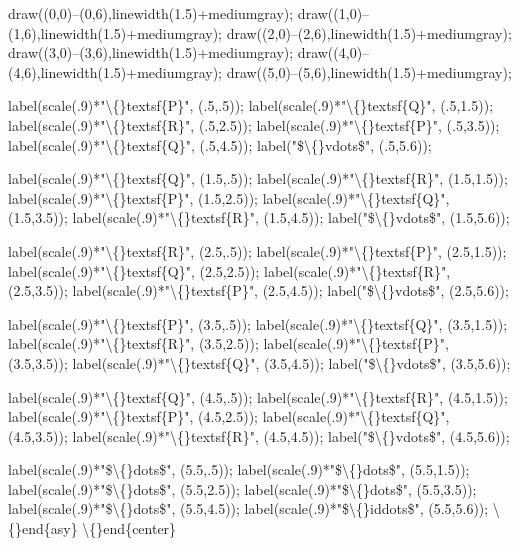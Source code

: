 \documentclass{article}
\begin{document}
\begin{enumerate}[label=\arabic*., itemsep=0.5em]
draw((0,0)--(0,6),linewidth(1.5)+mediumgray);
draw((1,0)--(1,6),linewidth(1.5)+mediumgray);
draw((2,0)--(2,6),linewidth(1.5)+mediumgray);
draw((3,0)--(3,6),linewidth(1.5)+mediumgray);
draw((4,0)--(4,6),linewidth(1.5)+mediumgray);
draw((5,0)--(5,6),linewidth(1.5)+mediumgray);

label(scale(.9)*"\textbackslash\{\}textsf\{P\}", (.5,.5));
label(scale(.9)*"\textbackslash\{\}textsf\{Q\}", (.5,1.5));
label(scale(.9)*"\textbackslash\{\}textsf\{R\}", (.5,2.5));
label(scale(.9)*"\textbackslash\{\}textsf\{P\}", (.5,3.5));
label(scale(.9)*"\textbackslash\{\}textsf\{Q\}", (.5,4.5));
label("\$\textbackslash\{\}vdots\$", (.5,5.6));

label(scale(.9)*"\textbackslash\{\}textsf\{Q\}", (1.5,.5));
label(scale(.9)*"\textbackslash\{\}textsf\{R\}", (1.5,1.5));
label(scale(.9)*"\textbackslash\{\}textsf\{P\}", (1.5,2.5));
label(scale(.9)*"\textbackslash\{\}textsf\{Q\}", (1.5,3.5));
label(scale(.9)*"\textbackslash\{\}textsf\{R\}", (1.5,4.5));
label("\$\textbackslash\{\}vdots\$", (1.5,5.6));

label(scale(.9)*"\textbackslash\{\}textsf\{R\}", (2.5,.5));
label(scale(.9)*"\textbackslash\{\}textsf\{P\}", (2.5,1.5));
label(scale(.9)*"\textbackslash\{\}textsf\{Q\}", (2.5,2.5));
label(scale(.9)*"\textbackslash\{\}textsf\{R\}", (2.5,3.5));
label(scale(.9)*"\textbackslash\{\}textsf\{P\}", (2.5,4.5));
label("\$\textbackslash\{\}vdots\$", (2.5,5.6));

label(scale(.9)*"\textbackslash\{\}textsf\{P\}", (3.5,.5));
label(scale(.9)*"\textbackslash\{\}textsf\{Q\}", (3.5,1.5));
label(scale(.9)*"\textbackslash\{\}textsf\{R\}", (3.5,2.5));
label(scale(.9)*"\textbackslash\{\}textsf\{P\}", (3.5,3.5));
label(scale(.9)*"\textbackslash\{\}textsf\{Q\}", (3.5,4.5));
label("\$\textbackslash\{\}vdots\$", (3.5,5.6));

label(scale(.9)*"\textbackslash\{\}textsf\{Q\}", (4.5,.5));
label(scale(.9)*"\textbackslash\{\}textsf\{R\}", (4.5,1.5));
label(scale(.9)*"\textbackslash\{\}textsf\{P\}", (4.5,2.5));
label(scale(.9)*"\textbackslash\{\}textsf\{Q\}", (4.5,3.5));
label(scale(.9)*"\textbackslash\{\}textsf\{R\}", (4.5,4.5));
label("\$\textbackslash\{\}vdots\$", (4.5,5.6));

label(scale(.9)*"\$\textbackslash\{\}dots\$", (5.5,.5));
label(scale(.9)*"\$\textbackslash\{\}dots\$", (5.5,1.5));
label(scale(.9)*"\$\textbackslash\{\}dots\$", (5.5,2.5));
label(scale(.9)*"\$\textbackslash\{\}dots\$", (5.5,3.5));
label(scale(.9)*"\$\textbackslash\{\}dots\$", (5.5,4.5));
label(scale(.9)*"\$\textbackslash\{\}iddots\$", (5.5,5.6));
\textbackslash\{\}end\{asy\}
\textbackslash\{\}end\{center\}


\end{enumerate}
\end{document}
